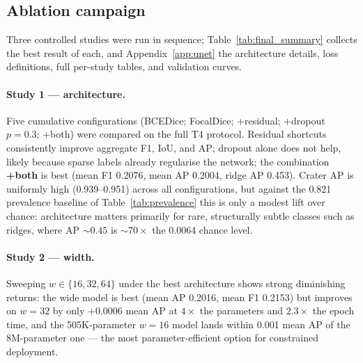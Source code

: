 \subsection{Ablation campaign}
\label{sec:mr_augmentation}

Three controlled studies were run in sequence; Table~\ref{tab:final_summary} collects the best result of each, and Appendix~\ref{app:unet} the architecture details, loss definitions, full per-study tables, and validation curves.

\paragraph{Study 1 --- architecture.}
Five cumulative configurations (BCEDice; FocalDice; +residual; +dropout $p=0.3$; +both) were compared on the full T4 protocol. Residual shortcuts consistently improve aggregate F1, IoU, and AP; dropout alone does not help, likely because sparse labels already regularise the network; the combination \textbf{+both} is best (mean F1 0.2076, mean AP 0.2004, ridge AP 0.453). Crater AP is uniformly high (0.939--0.951) across all configurations, but against the 0.821 prevalence baseline of Table~\ref{tab:prevalence} this is only a modest lift over chance: architecture matters primarily for rare, structurally subtle classes such as ridges, where AP ${\sim}0.45$ is ${\sim}70\times$ the 0.0064 chance level.

\paragraph{Study 2 --- width.}
Sweeping $w\in\{16,32,64\}$ under the best architecture shows strong diminishing returns: the wide model is best (mean AP 0.2016, mean F1 0.2153) but improves on $w=32$ by only $+0.0006$ mean AP at $4\times$ the parameters and $2.3\times$ the epoch time, and the 505K-parameter $w=16$ model lands within 0.001 mean AP of the 8M-parameter one --- the most parameter-efficient option for constrained deployment.


